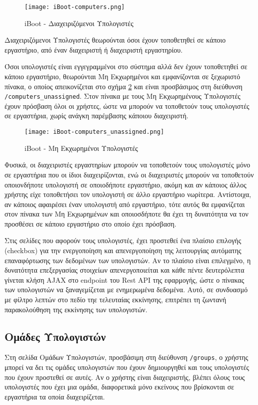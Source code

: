 \begin{figure}[ht]
	\centering
	\texttt{[image: iBoot-computers.png]}
	\caption{iBoot - Διαχειριζόμενοι Υπολογιστές}
	\label{fig:iBoot_computers}
\end{figure}
Διαχειριζόμενοι Υπολογιστές θεωρούνται όσοι έχουν τοποθετηθεί σε κάποιο εργαστήριο, από έναν διαχειριστή ή διαχειριστή εργαστηρίου.

Όσοι υπολογιστές είναι εγγεγραμμένοι στο σύστημα αλλά δεν έχουν τοποθετηθεί σε κάποιο εργαστήριο, θεωρούνται Μη Εκχωρημένοι και εμφανίζονται σε ξεχωριστό πίνακα, ο οποίος απεικονίζεται στο σχήμα \ref{fig:iBoot_computers_unassigned} και είναι προσβάσιμος στη διεύθυνση \verb!/computers_unassigned!. Στον πίνακα με τους Μη Εκχωρημένους Υπολογιστές έχουν πρόσβαση όλοι οι χρήστες, ώστε να μπορούν να τοποθετούν τους υπολογιστές σε εργαστήρια, χωρίς ανάγκη παρέμβασης κάποιου διαχειριστή.

\begin{figure}[ht]
	\centering
	\texttt{[image: iBoot-computers\_unassigned.png]}
	\caption{iBoot - Μη Εκχωρημένοι Υπολογιστές}
	\label{fig:iBoot_computers_unassigned}
\end{figure}
\FloatBarrier

Φυσικά, οι διαχειριστές εργαστηρίων μπορούν να τοποθετούν τους υπολογιστές μόνο σε εργαστήρια που οι ίδιοι διαχειρίζονται, ενώ οι διαχειριστές μπορούν να τοποθετούν οποιονδήποτε υπολογιστή σε οποιοδήποτε εργαστήριο, ακόμη και αν κάποιος άλλος χρήστης είχε τοποθετήσει τον υπολογιστή σε άλλο εργαστήριο νωρίτερα. Αντίστοιχα, αν κάποιος αφαιρέσει έναν υπολογιστή από εργαστήριο, τότε αυτός θα εμφανίζεται στον πίνακα των Μη Εκχωρημένων και οποιοσδήποτε θα έχει τη δυνατότητα να τον προσθέσει σε κάποιο εργαστήριο στο οποίο έχει πρόσβαση.

Στις σελίδες που αφορούν τους υπολογιστές, έχει προστεθεί ένα πλαίσιο επιλογής (checkbox) για την ενεργοποίηση και απενεργοποίηση της λειτουργίας αυτόματης επαναφόρτωσης των δεδομένων των υπολογιστών. Αν το πλαίσιο είναι επιλεγμένο, η δυνατότητα επεξεργασίας στοιχείων απενεργοποιείται και κάθε πέντε δευτερόλεπτα γίνεται κλήση AJAX στο endpoint του Rest API της εφαρμογής, ώστε ο πίνακας των υπολογιστών να ξαναγεμίζεται με ενημερωμένα δεδομένα. Αυτό, σε συνδυασμό με φίλτρο λεπτών στο πεδίο τηε τελευταίας εκκίνησης, επιτρέπει τη ζωντανή παρακολούθηση της εκκίνησης των υπολογιστών.

\subsection{Ομάδες Υπολογιστών}
\FloatBarrier
Στη σελίδα Ομάδων Υπολογιστών, προσβάσιμη στη διεύθυνση \verb!/groups!, ο χρήστης μπορεί να δει τις ομάδες υπολογιστών που έχουν δημιουργηθεί και τους υπολογιστές που έχουν προστεθεί σε αυτές. Αν ο χρήστης είναι διαχειριστής, βλέπει όλους τους υπολογιστές που έχει μια ομάδα, διαφορετικά μόνο εκείνους που βρίσκονται σε εργαστήρια τα οποία διαχειρίζεται.

